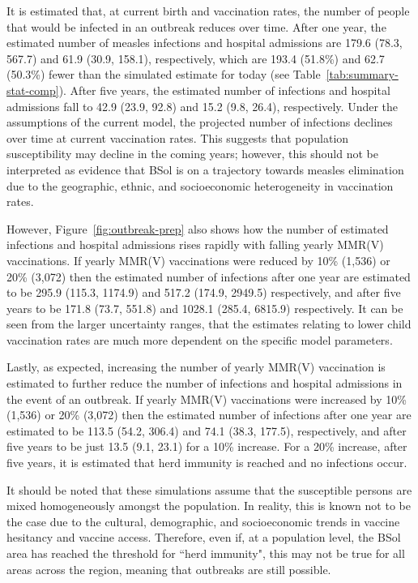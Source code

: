 \documentclass{article}
\begin{document}
It is estimated that, at current birth and vaccination rates, the number of people that would be infected in an outbreak reduces over time. After one year, the estimated number of measles infections and hospital admissions are 179.6 (78.3, 567.7) and 61.9 (30.9, 158.1), respectively, which are 193.4 (51.8\%) and 62.7 (50.3\%) fewer than the simulated estimate for today (see Table~\ref{tab:summary-stat-comp}). After five years, the estimated number of infections and hospital admissions fall to 42.9 (23.9, 92.8) and 15.2 (9.8, 26.4), respectively. Under the assumptions of the current model, the projected number of infections declines over time at current vaccination rates. This suggests that population susceptibility may decline in the coming years; however, this should not be interpreted as evidence that BSol is on a trajectory towards measles elimination due to the geographic, ethnic, and socioeconomic heterogeneity in vaccination rates. 

However, Figure~\ref{fig:outbreak-prep} also shows how the number of estimated infections and hospital admissions rises rapidly with falling yearly MMR(V) vaccinations. If yearly MMR(V) vaccinations were reduced by 10\% (1,536) or 20\% (3,072) then the estimated number of infections after one year are estimated to be 295.9 (115.3, 1174.9) and 517.2 (174.9, 2949.5) respectively, and after five years to be 171.8 (73.7, 551.8) and 1028.1 (285.4, 6815.9) respectively. It can be seen from the larger uncertainty ranges, that the estimates relating to lower child vaccination rates are much more dependent on the specific model parameters. 

Lastly, as expected, increasing the number of yearly MMR(V) vaccination is estimated to further reduce the number of infections and hospital admissions in the event of an outbreak. If yearly MMR(V) vaccinations were increased by 10\% (1,536) or 20\% (3,072) then the estimated number of infections after one year are estimated to be 113.5 (54.2, 306.4) and 74.1 (38.3, 177.5), respectively, and after five years to be just 13.5 (9.1, 23.1) for a 10\% increase. For a 20\% increase, after five years, it is estimated that herd immunity is reached and no infections occur. 

It should be noted that these simulations assume that the susceptible persons are mixed homogeneously amongst the population. In reality, this is known not to be the case due to the cultural, demographic, and socioeconomic trends in vaccine hesitancy and vaccine access. Therefore, even if, at a population level, the BSol area has reached the threshold for ``herd immunity", this may not be true for all areas across the region, meaning that outbreaks are still possible. 
\end{document}
